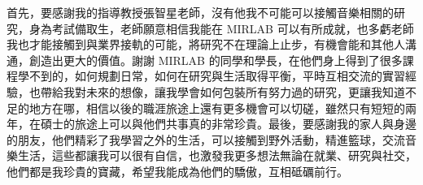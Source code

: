 
\begin{acknowledgement}

首先，要感謝我的指導教授張智星老師，沒有他我不可能可以接觸音樂相關的研究，身為考試備取生，老師願意相信我能在 MIRLAB 可以有所成就，也多虧老師我也才能接觸到與業界接軌的可能，將研究不在理論上止步，有機會能和其他人溝通，創造出更大的價值。謝謝 MIRLAB 的同學和學長，在他們身上得到了很多課程學不到的，如何規劃日常，如何在研究與生活取得平衡，平時互相交流的實習經驗，也帶給我對未來的想像，讓我學會如何包裝所有努力過的研究，更讓我知道不足的地方在哪，相信以後的職涯旅途上還有更多機會可以切磋，雖然只有短短的兩年，在碩士的旅途上可以與他們共事真的非常珍貴。最後，要感謝我的家人與身邊的朋友，他們精彩了我學習之外的生活，可以接觸到野外活動，精進籃球，交流音樂生活，這些都讓我可以很有自信，也激發我更多想法無論在就業、研究與社交，他們都是我珍貴的寶藏，希望我能成為他們的驕傲，互相砥礪前行。

\end{acknowledgement}